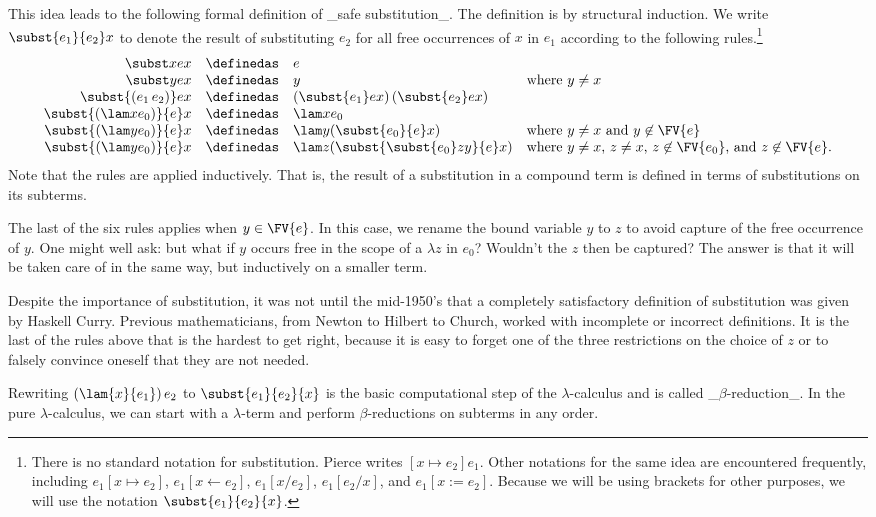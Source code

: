 This idea leads to the following formal definition of _safe substitution_.
The definition is by structural induction.
We write $\subst{e_1}{e_2}x$ to denote the result of substituting
$e_2$ for all free occurrences of $x$ in $e_1$ according to the following rules.\footnote{There is no standard notation for substitution.
Pierce \cite{Pierce02} writes $[x \mapsto e_2]e_1$. Other notations for the same idea
are encountered frequently, including $e_1[x\mapsto e_2]$, $e_1[x \leftarrow e_2]$, $e_1[x/e_2]$, $e_1[e_2/x]$, and
$e_1[x := e_2]$. Because we will be using brackets for other purposes,
we will use the notation $\subst{e_1}{e_2}{x}$.}
\[
\begin{array}{rcll}
\subst xex &\definedas& e\\
\subst yex &\definedas& y & \mbox{where $y\neq x$}\\
\subst{(e_1\,e_2)}ex &\definedas& (\subst{e_1}ex)\,(\subst{e_2}ex)\\
\subst{(\lam x{e_0})}{e}x &\definedas& \lam x{e_0}\\
\subst{(\lam y{e_0})}{e}x &\definedas& \lam y{(\subst{e_0}{e}x)} & \mbox{where $y\neq x$ and $y\not\in\FV{e}$}\\
\subst{(\lam y{e_0})}{e}x &\definedas& \lam z{(\subst{\subst{e_0}zy}{e}x)} & \mbox{where $y\neq x$, $z\neq x$, $z\not\in\FV{e_0}$, and $z\not\in\FV{e}$}.
\end{array}
\]
Note that the rules are applied inductively. That is, the result of a
substitution in a compound term is defined in terms of substitutions
on its subterms.

The last of the six rules applies when
$y\in\FV{e}$. In this case, we rename the bound variable $y$ to
$z$ to avoid capture of the free occurrence of $y$.
One might well ask: but what if $y$ occurs free in the scope of a $\lambda z$ in $e_0$?
Wouldn't the $z$ then be captured? The answer is that it will be taken
care of in the same way, but inductively on a smaller term.

Despite the importance of substitution, it was not until the mid-1950's
that a completely satisfactory definition of substitution was given by
Haskell Curry. Previous mathematicians, from Newton to Hilbert to
Church, worked with incomplete or incorrect definitions. It is the
last of the rules above that is the hardest to get right, because it is easy
to forget one of the three restrictions on the choice of $z$ or to
falsely convince oneself that they are not needed.

Rewriting $(\lam{x}{e_1})\,e_2$ to $\subst{e_1}{e_2}{x}$ is the basic computational step
of the $\lambda$-calculus and is called _$\beta$-reduction_. In the pure $\lambda$-calculus,
we can start with a $\lambda$-term and perform $\beta$-reductions on subterms in any order.


